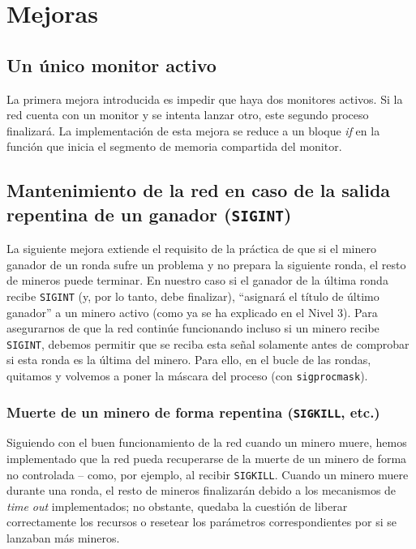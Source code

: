 \documentclass{article}
\begin{document}
\section*{Mejoras}

\subsection*{Un único monitor activo}
La primera mejora introducida es impedir que haya dos monitores activos. Si la red cuenta con un monitor y se intenta lanzar otro, este segundo proceso finalizará. La implementación de esta mejora se reduce a un bloque \emph{if} en la función que inicia el segmento de memoria compartida del monitor.

\subsection*{Mantenimiento de la red en caso de la salida repentina de un ganador (\texttt{SIGINT})}
La siguiente mejora extiende el requisito de la práctica de que si el minero ganador de un ronda sufre un problema y no prepara la siguiente ronda, el resto de mineros puede terminar. En nuestro caso si el ganador de la última ronda recibe \texttt{SIGINT} (y, por lo tanto, debe finalizar), ``asignará el título de último ganador'' a un minero activo (como ya se ha explicado en el Nivel 3). Para asegurarnos de que la red continúe funcionando incluso si un minero recibe \texttt{SIGINT}, debemos permitir que se reciba esta señal solamente antes de comprobar si esta ronda es la última del minero. Para ello, en el bucle de las rondas, quitamos y volvemos a poner la máscara del proceso (con \texttt{sigprocmask}). 

\subsubsection*{Muerte de un minero de forma repentina (\texttt{SIGKILL}, etc.)}
Siguiendo con el buen funcionamiento de la red cuando un minero muere, hemos implementado que la red pueda recuperarse de la muerte de un minero de forma no controlada -- como, por ejemplo, al recibir \texttt{SIGKILL}. Cuando un minero muere durante una ronda, el resto de mineros finalizarán debido a los mecanismos de \textit{time out} implementados; no obstante, quedaba la cuestión de liberar correctamente los recursos o resetear los parámetros correspondientes por si se lanzaban más mineros. 
\end{document}
